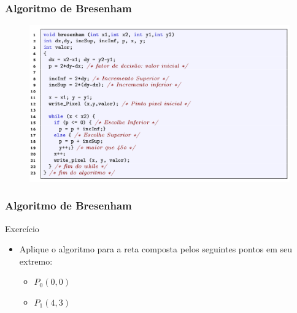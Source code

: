 \documentclass{beamer}
\begin{document}
\begin{frame}
\frametitle{Algoritmo de Bresenham}

		\begin{figure}[!h]
			\begin{center}
			\includegraphics[width=1\textwidth]{Figures/AlgBre}
			\end{center}
		\end{figure}
\end{frame}

\begin{frame}
\frametitle{Algoritmo de Bresenham}
		\begin{block}{Exercício}
		\begin{itemize}
			\item Aplique o algoritmo para a reta composta pelos seguintes pontos em seu extremo:
				\begin{itemize}
					\item $P_0(0,0)$
					\item $P_1(4,3)$
				\end{itemize}
		\end{itemize}
	\end{block}
\end{frame}

\end{document}
